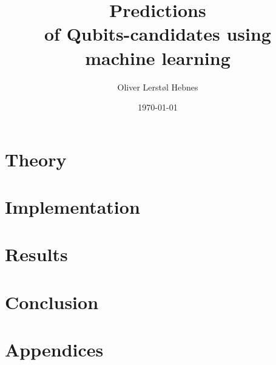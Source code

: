 \documentclass[twoside, english, notitlepage, 12pt]{uiofysmaster}
\author{Oliver Lerstøl Hebnes}
\title{Predictions\\
of Qubits-candidates
using\\ machine learning
}
\date{\today}
\begin{document}
\hypersetup{pageanchor=false}
\frontmatter
    \maketitle

    \begin{abstract}
    
    \end{abstract}

    \begin{acknowledgements}
    
    \end{acknowledgements}

    \tableofcontents
    \newpage


    

    \part{Theory}


    \part{Implementation}


    \part{Results}


    \part{Conclusion}


    \part{Appendices}
    \appendix

        

        \nocite{*}
        \printbibliography%
\end{document}
